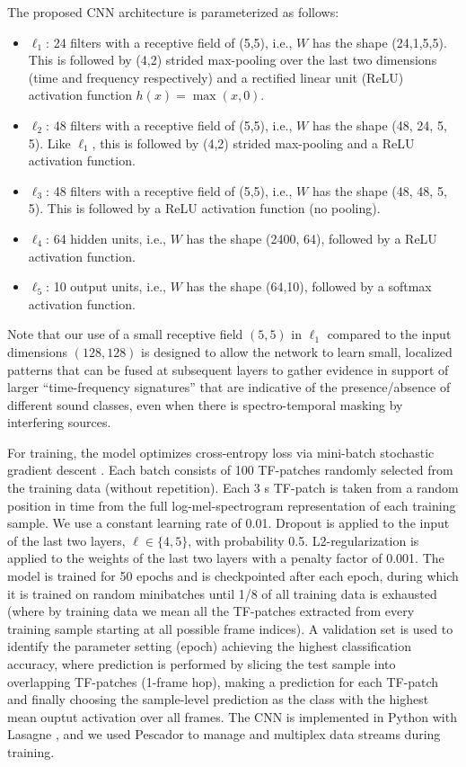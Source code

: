 \documentclass[journal,pdf]{IEEEtran}
\begin{document}
The proposed CNN architecture is parameterized as follows:
\begin{itemize}
\item $\ell_1$: 24 filters with a receptive field of (5,5), i.e., $W$ has the shape (24,1,5,5). This is followed by (4,2) strided max-pooling over the last two dimensions (time and frequency respectively) 
and a rectified linear unit (ReLU) activation function $h(x) = \max(x,0)$.
\item $\ell_2$: 48 filters with a receptive field of (5,5), i.e., $W$ has the shape (48, 24, 5, 5). Like $\ell_1$, this is followed by (4,2) strided max-pooling and a ReLU activation function.
\item $\ell_3$: 48 filters with a receptive field of (5,5), i.e., $W$ has the shape (48, 48, 5, 5). This is followed by a ReLU activation function (no pooling).
\item $\ell_4$: 64 hidden units, i.e., $W$ has the shape (2400, 64), followed by a ReLU activation function.
\item $\ell_5$: 10 output units, i.e., $W$ has the shape (64,10), followed by a softmax activation function.
\end{itemize}
Note that our use of a small receptive field $(5,5)$ in $\ell_1$ compared to the input dimensions $(128,128)$ is designed to allow the network to learn small, localized patterns that can be fused at subsequent layers to gather evidence in support of larger ``time-frequency signatures'' that are indicative of the presence/absence of different sound classes, even when there is spectro-temporal masking by interfering sources.

For training, the model optimizes cross-entropy loss via mini-batch stochastic gradient descent \cite{Bottou:SGD:COMPSTAT:10}. Each batch consists of 100 TF-patches randomly selected from the training data (without repetition). Each 3 s TF-patch is taken from a random position in time from the full log-mel-spectrogram representation of each training sample. We use a constant learning rate of 0.01. Dropout \cite{Srivastava:Dropout:JMLR:14} is applied to the input of the last two layers, $\ell \in \{4,5\}$, with probability 0.5. L2-regularization is applied to the weights of the last two layers with a penalty factor of 0.001. The model is trained for 50 epochs and is checkpointed after each epoch, during which it is trained on random minibatches until 1/8 of all training data is exhausted (where by training data we mean all the TF-patches extracted from every training sample starting at all possible frame indices).
A validation set is used to identify the parameter setting (epoch) achieving the highest classification accuracy, where prediction is performed by slicing the test sample into overlapping TF-patches (1-frame hop), making a prediction for each TF-patch and finally choosing the sample-level prediction as the class with the highest mean ouptut activation over all frames.
The CNN is implemented in Python with Lasagne \cite{Dieleman:Lasagne:ZENODO:15}, and we used Pescador \cite{McFee:Pescador:ZENODO:15} to manage and multiplex data streams during training.
\end{document}
